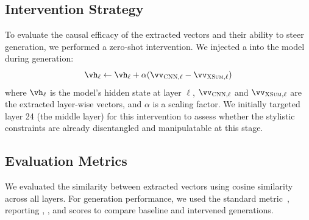 \subsection{Intervention Strategy}
To evaluate the causal efficacy of the extracted vectors and their ability to steer generation, we performed a zero-shot intervention. We injected a  into the model during generation:
\begin{equation}
    \vh_{\ell} \gets \vh_{\ell} + \alpha (\vv_{\textsc{CNN}, \ell} - \vv_{\textsc{XSum}, \ell})
\end{equation}
where $\vh_{\ell}$ is the model's hidden state at layer $\ell$, $\vv_{\textsc{CNN}, \ell}$ and $\vv_{\textsc{XSum}, \ell}$ are the extracted layer-wise vectors, and $\alpha$ is a scaling factor. We initially targeted layer 24 (the middle layer) for this intervention to assess whether the stylistic constraints are already disentangled and manipulatable at this stage.

\subsection{Evaluation Metrics}
We evaluated the similarity between extracted vectors using cosine similarity across all layers. For generation performance, we used the standard \rouge metric~\cite{lin2004rouge}, reporting \rougeone, \rougetwo, and \rougel scores to compare baseline and intervened generations.
